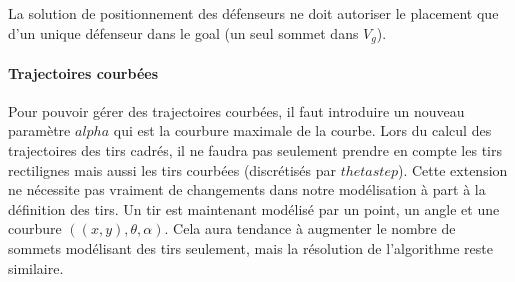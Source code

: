 \documentclass[12pt]{article}
\begin{document}
La solution de positionnement des défenseurs ne doit autoriser le placement que d'un unique défenseur dans le goal (un seul sommet dans $V_g$).

\paragraph{Trajectoires courbées}
Pour pouvoir gérer des trajectoires courbées, il faut introduire un nouveau paramètre $alpha$ qui est la courbure maximale de la courbe. Lors du calcul des trajectoires des tirs cadrés, il ne faudra pas seulement prendre en compte les tirs rectilignes mais aussi les tirs courbées (discrétisés par $thetastep$).
Cette extension ne nécessite pas vraiment de changements dans notre modélisation à part à la définition des tirs. Un tir est maintenant modélisé par un point, un angle et une courbure $((x,y), \theta, \alpha)$. Cela aura tendance à augmenter le nombre de sommets modélisant des tirs seulement, mais la résolution de l'algorithme reste similaire.
\end{document}
